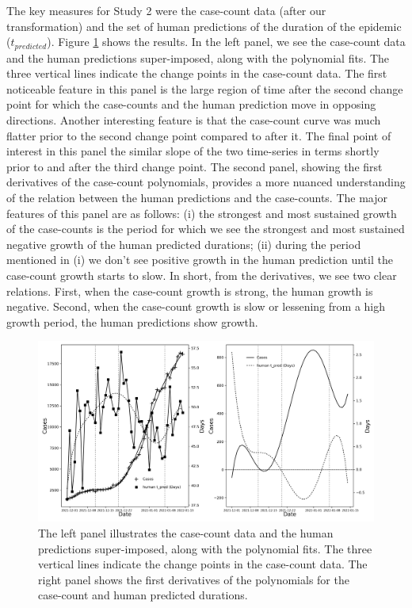 The key measures for Study 2 were the case-count data (after our transformation) and the set of human predictions of the duration of the epidemic ($t_{predicted}$).  Figure \ref{fig:Study_2_Multi} shows the results.  In the left panel, we see the case-count data and the human predictions super-imposed, along with the polynomial fits.  The three vertical lines indicate the change points in the case-count data.  The first noticeable feature in this panel is the large region of time after the second change point for which the case-counts and the human prediction move in opposing directions.  Another interesting feature is that the case-count curve was much flatter prior to the second change point compared to after it.  The final point of interest in this panel the similar slope of the two time-series in terms shortly prior to and after the third change point.  The second panel, showing the first derivatives of the case-count polynomials, provides a more nuanced understanding of the relation between the human predictions and the case-counts.  The major features of this panel are as follows:  (i) the strongest and most sustained growth of the case-counts is the period for which we see the strongest and most sustained negative growth of the human predicted durations; (ii) during the period mentioned in (i) we don't see positive growth in the human prediction until the case-count growth starts to slow.  In short, from the derivatives, we see two clear relations.  First, when the case-count growth is strong, the human growth is negative.  Second, when the case-count growth is slow or lessening from a high growth period, the human predictions show growth. 

\begin{figure}
    \centering
    \includegraphics[width=\linewidth]{Figures/Study_2_Figure.png}
    \caption{The left panel illustrates the case-count data and the human predictions super-imposed, along with the polynomial fits.  The three vertical lines indicate the change points in the case-count data.  The right panel shows the first derivatives of the polynomials for the case-count and human predicted durations.}
    \label{fig:Study_2_Multi}
\end{figure}